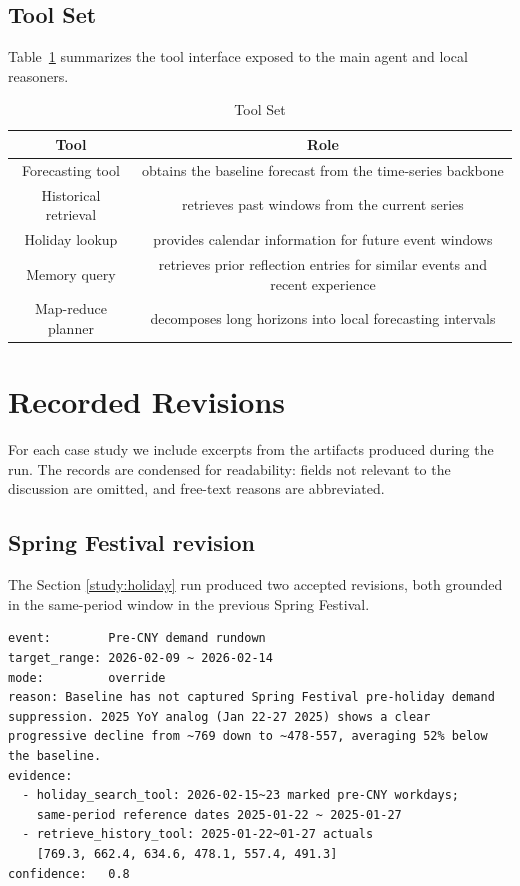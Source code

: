 \documentclass{article}
\theoremstyle{plain}
\theoremstyle{definition}
\theoremstyle{remark}
\begin{document}
\subsection{Tool Set}

Table~\ref{tab:tool-set} summarizes the tool interface exposed to the main agent and local reasoners.


\begin{table}[]
\centering
\begin{tabular}{@{}cc@{}}
\toprule
\textbf{Tool}        & \textbf{Role}                                               \\ \midrule
Forecasting tool     & obtains the baseline forecast from the time-series backbone \\
Historical retrieval & retrieves past windows from the current series              \\
Holiday lookup       & provides calendar information for future event windows      \\
Memory query         & retrieves prior reflection entries for similar events and recent experience       \\
Map-reduce planner   & decomposes long horizons into local forecasting intervals      \\ \bottomrule
\end{tabular}
\caption{Tool Set}
\label{tab:tool-set}
\end{table}


\section{Recorded Revisions}\label{app:recorded-revisions}

For each case study we include excerpts from the artifacts produced during the run. The records are condensed for readability: fields not relevant to the discussion are omitted, and free-text reasons are abbreviated.
\subsection{Spring Festival revision}\label{app:spring_festival_revision}

The Section \ref{study:holiday} run produced two accepted revisions, both grounded in the same-period window in the previous Spring Festival.

\begin{lstlisting}[caption={Spring Festival revision: Pre-holiday}, label={lst:case_study_6_2_1}]
event:        Pre-CNY demand rundown
target_range: 2026-02-09 ~ 2026-02-14
mode:         override
reason: Baseline has not captured Spring Festival pre-holiday demand suppression. 2025 YoY analog (Jan 22-27 2025) shows a clear progressive decline from ~769 down to ~478-557, averaging 52% below the baseline.
evidence:
  - holiday_search_tool: 2026-02-15~23 marked pre-CNY workdays;
    same-period reference dates 2025-01-22 ~ 2025-01-27
  - retrieve_history_tool: 2025-01-22~01-27 actuals
    [769.3, 662.4, 634.6, 478.1, 557.4, 491.3]
confidence:   0.8
\end{lstlisting}
\end{document}
